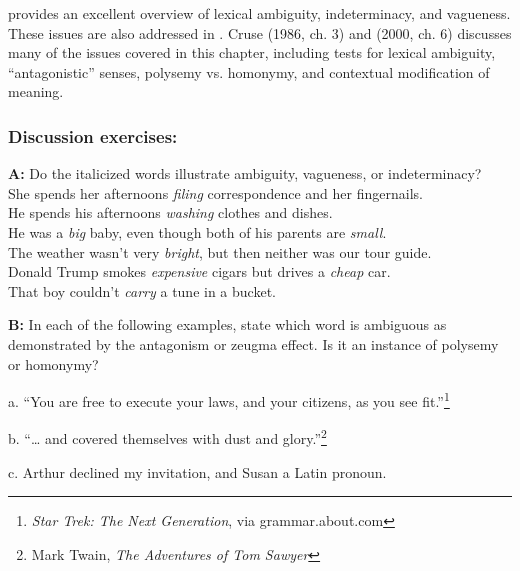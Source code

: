 \furtherreading



\citet{Kennedy2011} provides an excellent overview of lexical ambiguity, indeterminacy, and vagueness. These issues are also addressed in \citet{Gillon1990}. Cruse (1986, ch. 3) and (2000, ch. 6) discusses many of the issues covered in this chapter, including tests for lexical ambiguity, “antagonistic” senses, polysemy vs. homonymy, and contextual modification of meaning.


\subsubsection{Discussion exercises:}\label{sec:}
\ea
\textbf{A:} Do the italicized words illustrate ambiguity, vagueness, or indeterminacy?\\
\ea She spends her afternoons \textit{filing} correspondence and her fingernails.\\
\ex He spends his afternoons \textit{washing} clothes and dishes.\\
\ex He was a \textit{big} baby, even though both of his parents are \textit{small}.\\
\ex The weather wasn’t very \textit{bright}, but then neither was our tour guide.\\
\ex Donald Trump smokes \textit{expensive} cigars but drives a \textit{cheap} car.\\
\ex That boy couldn’t \textit{carry} a tune in a bucket.
                       \z
\z

\begin{stylepoints}
\textbf{B:} In each of the following examples, state which word is ambiguous as demonstrated by the antagonism or zeugma effect. Is it an instance of polysemy or homonymy?
\end{stylepoints}

\begin{stylepoints}
  a. “You are free to execute your laws, and your citizens, as you see fit.”\footnote{\textit{Star Trek: The Next Generation}, via grammar.about.com}
\end{stylepoints}

\begin{stylepoints}
  b. “… and covered themselves with dust and glory.”\footnote{Mark Twain, \textit{The Adventures of Tom Sawyer}}
\end{stylepoints}

\begin{stylepoints}
  c. Arthur declined my invitation, and Susan a Latin pronoun.
\end{stylepoints}

